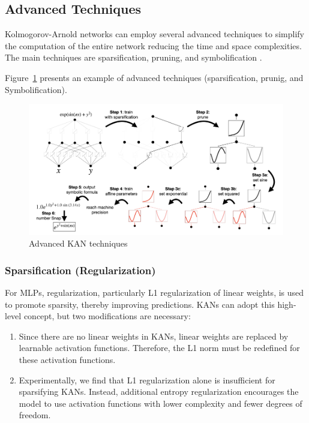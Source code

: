 \subsection{Advanced Techniques}
Kolmogorov-Arnold networks can employ several advanced techniques to simplify the computation of the entire network reducing the time and space complexities. The main techniques are sparsification, pruning, and symbolification \cite{KAN}. 

Figure~\ref{fig:advanced} presents an example of advanced techniques (sparsification, prunig, and Symbolification).

\begin{figure}[H]
    \centering
    \includegraphics[width=0.85\linewidth]{LATEX//Images/advanced.png}
    \caption{Advanced KAN techniques}
    \label{fig:advanced}
\end{figure}

\subsubsection{Sparsification (Regularization)}
For MLPs, regularization, particularly L1 regularization of linear weights, is used to promote sparsity, thereby improving predictions. KANs can adopt this high-level concept, but two modifications are necessary:

\begin{enumerate}
    \item Since there are no linear weights in KANs, linear weights are replaced by learnable activation functions. Therefore, the L1 norm must be redefined for these activation functions.
    \item Experimentally, we find that L1 regularization alone is insufficient for sparsifying KANs. Instead, additional entropy regularization encourages the model to use activation functions with lower complexity and fewer degrees of freedom.
\end{enumerate}

